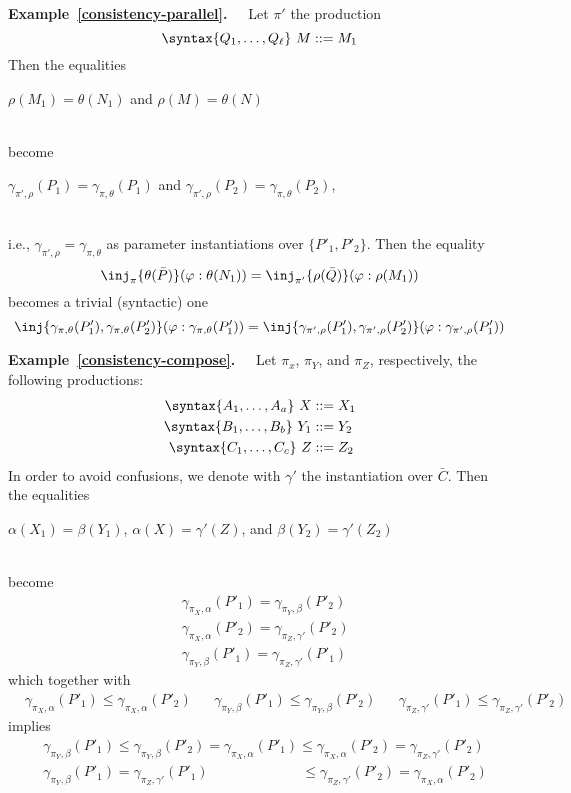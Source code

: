 \documentclass{article}
\theoremstyle{definition}
\theoremstyle{definition}
\theoremstyle{definition}
\theoremstyle{definition}
\theoremstyle{theorem}
\theoremstyle{theorem}
\theoremstyle{theorem}
\theoremstyle{theorem}
\theoremstyle{theorem}
\begin{document}
\begin{enumerate}[label=(\arabic*)]
{ \noindent
 \textbf{Example~\ref{consistency-parallel}.~~} 
Let $\pi'$ the production
\[\syntax\{Q_1,\ldots,Q_\ell\}\ M::=M_1\]
Then the equalities \\[1ex]
\centerline{\(\rho(M_1) = \theta(N_1)\) and \(\rho(M) = \theta(N)\)}\\[1ex]
become\\[1ex]
\centerline{$\gamma_{\pi',\rho}(P_1)=\gamma_{\pi,\theta}(P_1)$ and 
$\gamma_{\pi',\rho}(P_2)=\gamma_{\pi,\theta}(P_2)$,}\\[1ex]
i.e., $\gamma_{\pi',\rho}=\gamma_{\pi,\theta}$ as parameter instantiations over $\{P'_1,P'_2\}$.
Then the equality
\[\inj_{\pi}\{\theta(\bar{P})\}(\varphi:\theta(N_1))
 = \inj_{\pi'}\{\rho(\bar{Q})\}(\varphi:\rho(M_1))\]
 becomes a trivial (syntactic) one
 \[\inj\{\gamma_{\pi,\theta}(P'_1),\gamma_{\pi,\theta}(P'_2)\}(\varphi:\gamma_{\pi,\theta}(P'_1))
 =
 \inj\{\gamma_{\pi',\rho}(P'_1),\gamma_{\pi',\rho}(P'_2)\}(\varphi:\gamma_{\pi',\rho}(P'_1))\]
 
 \noindent
 \textbf{Example~\ref{consistency-compose}.~~}
Let $\pi_x$, $\pi_Y$, and $\pi_Z$, respectively, the following productions:
 \begin{align*}
\syntax\{A_1,\ldots,A_a\}\ X & ::=X_1\\
\syntax\{B_1,\ldots,B_b\}\ Y_1 & ::=Y_2\\
\syntax\{C_1,\ldots,C_c\}\ Z & ::=Z_2\\
\end{align*}
In order to avoid confusions, we denote with $\gamma'$ the instantiation over $\bar{C}$.
Then the equalities
\\[1ex]
\centerline{\(\alpha(X_1) = \beta(Y_1)\), \(\alpha(X) = \gamma'(Z)\),
and \(\beta(Y_2) = \gamma'(Z_2)\)}
\\[1ex]
become
\begin{align*}
& \gamma_{\pi_X,\alpha}(P'_1)=\gamma_{\pi_Y,\beta}(P'_2)\\
& \gamma_{\pi_X,\alpha}(P'_2)=\gamma_{\pi_Z,\gamma'}(P'_2)\\
& \gamma_{\pi_Y,\beta}(P'_1)=\gamma_{\pi_Z,\gamma'}(P'_1)
\end{align*}
which together with
\begin{align*}
&\gamma_{\pi_X,\alpha}(P'_1)\le\gamma_{\pi_X,\alpha}(P'_2)
&&\gamma_{\pi_Y,\beta}(P'_1)\le\gamma_{\pi_Y,\beta}(P'_2)
&&\gamma_{\pi_Z,\gamma'}(P'_1)\le\gamma_{\pi_Z,\gamma'}(P'_2)
\end{align*}
implies 
\begin{align*}
&\gamma_{\pi_Y,\beta}(P'_1)\le\gamma_{\pi_Y,\beta}(P'_2)=\gamma_{\pi_X,\alpha}(P'_1)\le \gamma_{\pi_X,\alpha}(P'_2)=\gamma_{\pi_Z,\gamma'}(P'_2)\\
&\gamma_{\pi_Y,\beta}(P'_1)=\gamma_{\pi_Z,\gamma'}(P'_1)
\phantom{{}=\gamma_{\pi_X,\alpha}(P'_1)}
\le \gamma_{\pi_Z,\gamma'}(P'_2) = \gamma_{\pi_X,\alpha}(P'_2)
\end{align*}

}
\end{enumerate}
\end{document}
